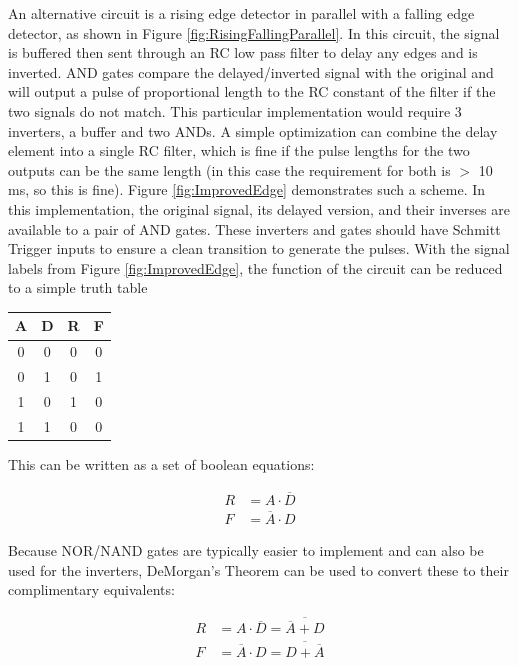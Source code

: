 \documentclass{article}
\begin{document}
		An alternative circuit is a rising edge detector in parallel with a falling edge detector, as shown in Figure \ref{fig:RisingFallingParallel}.  In this circuit, the signal is buffered then sent through an RC low pass filter to delay any edges and is inverted.  AND gates compare the delayed/inverted signal with the original and will output a pulse of proportional length to the RC constant of the filter if the two signals do not match.  This particular implementation would require 3 inverters, a buffer and two ANDs.  A simple optimization can combine the delay element into a single RC filter, which is fine if the pulse lengths for the two outputs can be the same length (in this case the requirement for both is $>$ 10 ms, so this is fine).  Figure \ref{fig:ImprovedEdge} demonstrates such a scheme.  In this implementation, the original signal, its delayed version, and their inverses are available to a pair of AND gates.  These inverters and gates should have Schmitt Trigger inputs to ensure a clean transition to generate the pulses.  With the signal labels from Figure \ref{fig:ImprovedEdge}, the function of the circuit can be reduced to a simple truth table

		\begin{center}
		\begin{tabular}{c c|c c}
			A & D & R & F \\
			\hline
			0 & 0 & 0 & 0 \\
			0 & 1 & 0 & 1 \\
			1 & 0 & 1 & 0 \\
			1 & 1 & 0 & 0
		\end{tabular}
		\end{center}

		This can be written as a set of boolean equations:

		\begin{align}
			R &= A \cdot \overline{D} \\
			F &= \overline{A} \cdot D
		\end{align}

		Because NOR/NAND gates are typically easier to implement and can also be used for the inverters, DeMorgan's Theorem can be used to convert these to their complimentary equivalents:

		\begin{align}
			R &= A \cdot \overline{D} = \overline{\overline{A} + D}\\
			F &= \overline{A} \cdot D = \overline{D + \overline{A}}
		\end{align}
\end{document}
